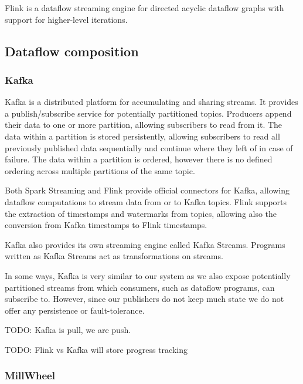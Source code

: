 Flink \cite{flink} is a dataflow streaming engine for directed acyclic dataflow
graphs with support for higher-level iterations. 


\subsection{Dataflow composition}

\subsubsection{Kafka}

Kafka \cite{kafka} is a distributed platform for accumulating and sharing streams. It provides
a publish/subscribe service for potentially partitioned topics. Producers append
their data to one or more partition, allowing subscribers to read from it.
The data within a partition is stored persistently, allowing subscribers to
read all previously published data sequentially and continue where they left
of in case of failure. The data within a partition is ordered, however there
is no defined ordering across multiple partitions of the same topic.

Both Spark Streaming and Flink provide official connectors for Kafka, allowing
dataflow computations to stream data from or to Kafka topics. Flink supports
the extraction of timestamps and watermarks from topics, allowing also the
conversion from Kafka timestamps to Flink timestamps.

Kafka also provides its own streaming engine called Kafka Streams. Programs
written as Kafka Streams act as transformations on streams.

In some ways, Kafka is very similar to our system as we also expose potentially
partitioned streams from which consumers, such as dataflow programs, can subscribe
to. However, since our publishers do not keep much state we do not offer any
persistence or fault-tolerance.

TODO: Kafka is pull, we are push.

TODO: Flink vs Kafka will store progress tracking


\subsubsection{MillWheel}
